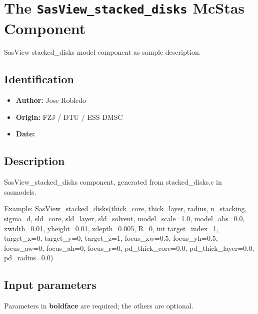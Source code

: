 \section{The \texttt{SasView\_stacked\_disks} McStas Component}
SasView stacked\_disks model component as sample description.

\subsection*{Identification}
\begin{itemize}
  \item \textbf{Author:} Jose Robledo
  \item \textbf{Origin:} FZJ / DTU / ESS DMSC
  \item \textbf{Date:} 
\end{itemize}

\subsection*{Description}
SasView\_stacked\_disks component, generated from stacked\_disks.c in sasmodels.

Example: SasView\_stacked\_disks(thick\_core, thick\_layer, radius, n\_stacking, sigma\_d, sld\_core, sld\_layer, sld\_solvent, model\_scale=1.0, model\_abs=0.0, xwidth=0.01, yheight=0.01, zdepth=0.005, R=0, int target\_index=1, target\_x=0, target\_y=0, target\_z=1, focus\_xw=0.5, focus\_yh=0.5, focus\_aw=0, focus\_ah=0, focus\_r=0, pd\_thick\_core=0.0, pd\_thick\_layer=0.0, pd\_radius=0.0)

\subsection*{Input parameters}
Parameters in \textbf{boldface} are required; the others are optional.

